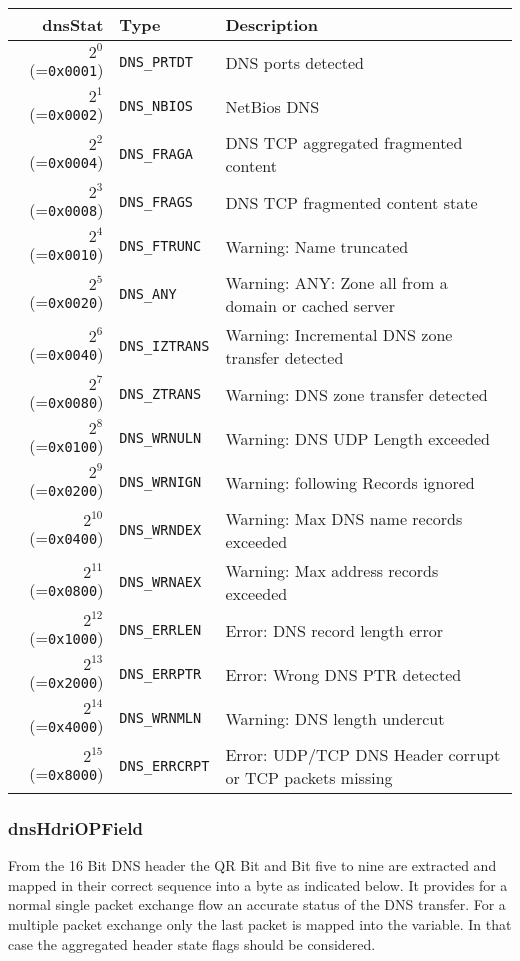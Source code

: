\documentclass[documentation]{subfiles}
\begin{document}
\begin{longtable}{rll}
    \toprule
    {\bf dnsStat} & {\bf Type} & {\bf Description}\\
    \midrule\endhead%
    $2^{0}$  (={\tt 0x0001}) & {\tt DNS\_PRTDT}   & DNS ports detected \\
    $2^{1}$  (={\tt 0x0002}) & {\tt DNS\_NBIOS}   & NetBios DNS\\
    $2^{2}$  (={\tt 0x0004}) & {\tt DNS\_FRAGA}   & DNS TCP aggregated fragmented content \\
    $2^{3}$  (={\tt 0x0008}) & {\tt DNS\_FRAGS}   & DNS TCP fragmented content state\\
    $2^{4}$  (={\tt 0x0010}) & {\tt DNS\_FTRUNC}  & Warning: Name truncated \\
    $2^{5}$  (={\tt 0x0020}) & {\tt DNS\_ANY}     & Warning: ANY: Zone all from a domain or cached server\\
    $2^{6}$  (={\tt 0x0040}) & {\tt DNS\_IZTRANS} & Warning: Incremental DNS zone transfer detected \\
    $2^{7}$  (={\tt 0x0080}) & {\tt DNS\_ZTRANS}  & Warning: DNS zone transfer detected \\
    $2^{8}$  (={\tt 0x0100}) & {\tt DNS\_WRNULN}  & Warning: DNS UDP Length exceeded \\
    $2^{9}$  (={\tt 0x0200}) & {\tt DNS\_WRNIGN}  & Warning: following Records ignored \\
    $2^{10}$ (={\tt 0x0400}) & {\tt DNS\_WRNDEX}  & Warning: Max DNS name records exceeded \\
    $2^{11}$ (={\tt 0x0800}) & {\tt DNS\_WRNAEX}  & Warning: Max address records exceeded \\
    $2^{12}$ (={\tt 0x1000}) & {\tt DNS\_ERRLEN}  & Error: DNS record length error\\
    $2^{13}$ (={\tt 0x2000}) & {\tt DNS\_ERRPTR}  & Error: Wrong DNS PTR detected\\
    $2^{14}$ (={\tt 0x4000}) & {\tt DNS\_WRNMLN}  & Warning: DNS length undercut\\
    $2^{15}$ (={\tt 0x8000}) & {\tt DNS\_ERRCRPT} & Error: UDP/TCP DNS Header corrupt or TCP packets missing\\
    \bottomrule
\end{longtable}

\subsubsection{dnsHdriOPField}\label{dnsHdriOPField}
From the 16 Bit DNS header the QR Bit and Bit five to nine are extracted and mapped in their correct sequence
into a byte as indicated below. It provides for a normal single packet exchange flow an accurate status of the
DNS transfer. For a multiple packet exchange only the last packet is mapped into the variable.
In that case the aggregated header state flags should be considered.
\end{document}
